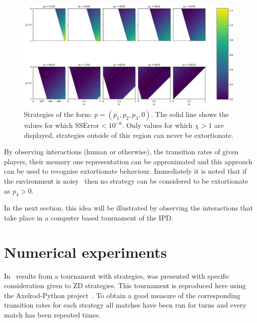 \documentclass[a4paper]{article}
\begin{document}
\begin{figure}[!htbp]
    \begin{center}
        \includegraphics[width=\textwidth]{assets/img/examples_of_extortion/main.pdf}
        \caption{Strategies of the form:
                 \(p=(p_1, p_2, p_3, 0)\). The solid line shows the values for
                 which \(\text{SSError} < 10 ^ {-6}\). Only values for which \(\chi > 1\) are
                 displayed, strategies outside of this region can never be
                 extortionate.}
        \label{fig:examples_of_extortion}
    \end{center}
\end{figure}

By observing interactions (human or otherwise), the transition rates of given
players, their memory one representation can be approximated and this approach
can be used to recognise extortionate behaviour. Immediately it is noted that if
the environment is noisy~\cite{Wu1995} then no strategy can be considered to be
extortionate as \(p_4>0\).

In the next section, this idea will be illustrated by observing the interactions
that take place in a computer based tournament of the IPD\@.

\section{Numerical experiments}\label{sec:numerical-experiments}

In~\cite{Stewart2012} results from a tournament with
 strategies,
was presented with specific consideration given to ZD strategies. This
tournament is reproduced here using the Axelrod-Python
project~\cite{Knight2016}. To obtain a good measure of the corresponding
transition rates for each strategy all matches have been run for
 turns and every match has been
repeated  times.
\end{document}

